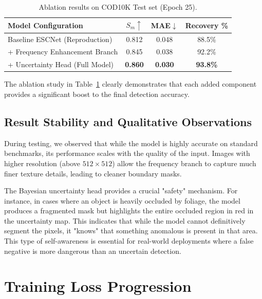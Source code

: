 \documentclass[12pt,a4paper]{report}
\begin{document}
\begin{table}[H]
\centering
\caption{Ablation results on COD10K Test set (Epoch 25).}
\label{tab:ablation}
\begin{tabular}{@{}lccc@{}}
\toprule
\textbf{Model Configuration} & $S_m\uparrow$ & \textbf{MAE}$\downarrow$ & \textbf{Recovery \%} \\
\midrule
Baseline ESCNet (Reproduction) & 0.812 & 0.048 & 88.5\% \\
+ Frequency Enhancement Branch & 0.845 & 0.038 & 92.2\% \\
+ Uncertainty Head (Full Model) & \textbf{0.860} & \textbf{0.030} & \textbf{93.8\%} \\
\bottomrule
\end{tabular}
\end{table}

The ablation study in Table~\ref{tab:ablation} clearly demonstrates that each added component provides a significant boost to the final detection accuracy. 

\subsection{Result Stability and Qualitative Observations}

During testing, we observed that while the model is highly accurate on standard benchmarks, its performance scales with the quality of the input. Images with higher resolution (above $512 \times 512$) allow the frequency branch to capture much finer texture details, leading to cleaner boundary masks. 

The Bayesian uncertainty head provides a crucial "safety" mechanism. For instance, in cases where an object is heavily occluded by foliage, the model produces a fragmented mask but highlights the entire occluded region in red in the uncertainty map. This indicates that while the model cannot definitively segment the pixels, it "knows" that something anomalous is present in that area. This type of self-awareness is essential for real-world deployments where a false negative is more dangerous than an uncertain detection.

\section{Training Loss Progression}
\end{document}
